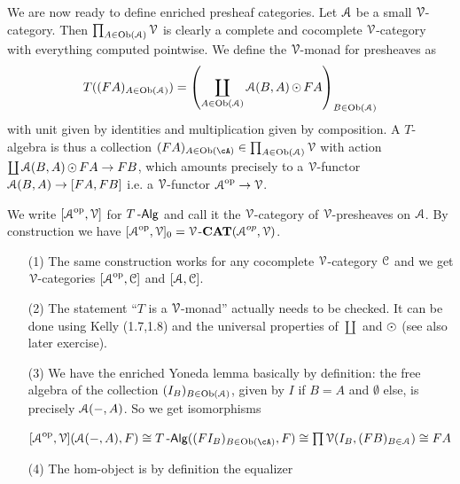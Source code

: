 \documentclass[a4paper,11pt,oneside,openany]{scrbook}
\begin{document}
We are now ready to define enriched presheaf categories. Let $\A$ be a small
$\V$-category. Then $\prod_{A \in \Ob(\A)}\V$ is clearly a complete and
cocomplete $\V$-category with everything computed pointwise. We define the
$\V$-monad for presheaves as
\begin{align*}
	T((FA)_{A \in \Ob(\A)}) = \left(\coprod_{A \in \Ob(\A)}\A(B,A)\copw FA\right)_{B \in \Ob(\A)}
\end{align*}
with unit given by identities and multiplication given by composition. A
$T$-algebra is thus a collection $(FA)_{A\in\Ob(\cA)}\in\prod_{A \in\Ob(\A)}\V$ with action
$\coprod \A(B,A) \copw FA \to FB$, which amounts precisely to a $\V$-functor $\A(B,A) \to [FA,FB]$ i.e. a $\V$-functor $\A^{\op} \to \V$.

\begin{defn}
	We write $[\A^{\op},\V]$ for $T\Alg$ and call it the $\V$-category of
    $\V$-presheaves on $\A$. By construction we have
	$[\A^{\op},\V]_{0} = \V$-$\CAT(\A^{op},\V)$.
\end{defn}

\begin{rmk}
	\begin{itemize}
		\item[(1)]
		      The same construction works for any cocomplete $\V$-category $\C$ and we get $\V$-categories $[\A^{\op},\C]$ and $[\A,\C]$.
		\item[(2)]
		      The statement ``$T$ is a $\V$-monad'' actually needs to be checked. It can be done using Kelly (1.7,1.8)   %
		      and the universal properties of $\coprod$ and $\copw$ (see also later exercise).
		\item[(3)]
		      We have the enriched Yoneda lemma basically by definition: the
              free algebra of the collection $(I_{B})_{B \in \Ob(\A)}$, given by
		      $I$ if $B=A$ and $\emptyset$ else, is precisely $\A(-,A)$. So we get isomorphisms
		      \begin{center}
                  $\lbrack \A^{\op},\V \rbrack (\A(-,A),F) \iso
                  T\Alg((FI_{B})_{B\in\Ob(\cA)},F) \iso \prod \V(I_{B},(FB)_{B\in \A}) \iso FA$
		      \end{center}
		\item[(4)]
		      The hom-object is by definition the equalizer
		      \begin{center}
		      \end{center}
	\end{itemize}
\end{rmk}
\end{document}
